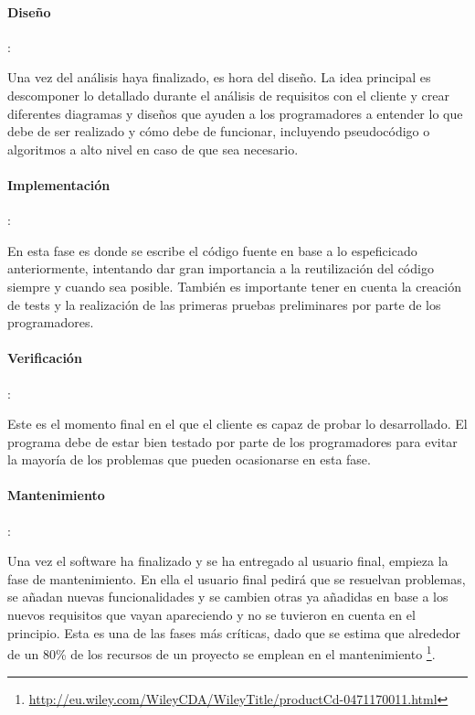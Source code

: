 \paragraph{Diseño}: 

Una vez del análisis haya finalizado, es hora del diseño. La idea principal es descomponer lo detallado durante el análisis de requisitos con el cliente y crear diferentes diagramas y diseños que ayuden a los programadores a entender lo que debe de ser realizado y cómo debe de funcionar, incluyendo pseudocódigo o algoritmos a alto nivel en caso de que sea necesario.

\paragraph{Implementación}:

En esta fase es donde se escribe el código fuente en base a lo espeficicado anteriormente, intentando dar gran importancia a la reutilización del código siempre y cuando sea posible. También es importante tener en cuenta la creación de tests y la realización de las primeras pruebas preliminares por parte de los programadores.

\paragraph{Verificación}:

Este es el momento final en el que el cliente es capaz de probar lo desarrollado. El programa debe de estar bien testado por parte de los programadores para evitar la mayoría de los problemas que pueden ocasionarse en esta fase.

\paragraph{Mantenimiento}:

Una vez el software ha finalizado y se ha entregado al usuario final, empieza la fase de mantenimiento. En ella el usuario final pedirá que se resuelvan problemas, se añadan nuevas funcionalidades y se cambien otras ya añadidas en base a los nuevos requisitos que vayan apareciendo y no se tuvieron en cuenta en el principio. Esta es una de las fases más críticas, dado que se estima que alrededor de un 80\% de los recursos de un proyecto se emplean en el mantenimiento \footnote{\url{http://eu.wiley.com/WileyCDA/WileyTitle/productCd-0471170011.html}}.

